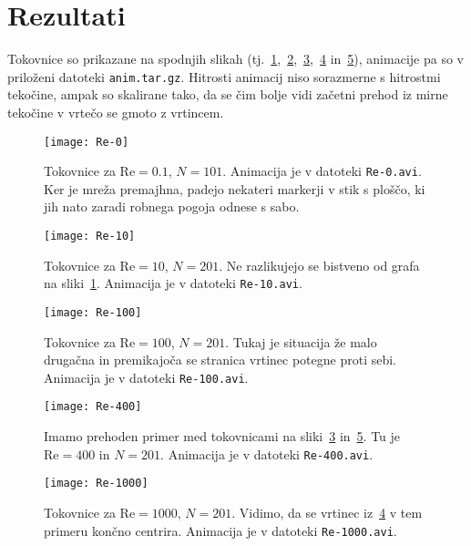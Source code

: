 \documentclass[a4 paper, 12pt]{article}
\renewcommand{\Re}{
    \ensuremath{\mathrm{Re}}
}
\begin{document}
\section{Rezultati}

Tokovnice so prikazane na spodnjih slikah (tj.~\ref{gr1},~\ref{gr1a},~\ref{gr2},~\ref{gr-prehod} in~\ref{gr3}),
animacije pa so v prilo\v zeni datoteki {\tt anim.tar.gz}. Hitrosti animacij niso sorazmerne s hitrostmi teko\v cine,
ampak so skalirane tako, da se \v cim bolje vidi za\v cetni prehod iz mirne teko\v cine v vrte\v co se gmoto z
vrtincem.

\begin{figure}[H]\centering
    \texttt{[image: Re-0]}
    \caption{Tokovnice za $\Re = 0.1$, $N = 101$. Animacija je v datoteki {\tt Re-0.avi}. Ker je mre\v za premajhna,
    padejo nekateri markerji v stik s plo\v s\v co, ki jih nato zaradi robnega pogoja odnese s sabo.}
    \label{gr1}
\end{figure}

\begin{figure}[H]\centering
    \texttt{[image: Re-10]}
    \caption{Tokovnice za $\Re = 10$, $N = 201$. Ne razlikujejo se bistveno od
    grafa na sliki~\ref{gr1}. Animacija je v datoteki {\tt Re-10.avi}.}
    \label{gr1a}
\end{figure}

\begin{figure}[H]\centering
    \texttt{[image: Re-100]}
    \caption{Tokovnice za $\Re = 100$, $N = 201$. Tukaj je situacija \v ze malo druga\v cna
    in premikajo\v ca se stranica vrtinec potegne proti sebi. Animacija je v datoteki
    {\tt Re-100.avi}.}
    \label{gr2}
\end{figure}

\begin{figure}[H]\centering
    \texttt{[image: Re-400]}
    \caption{Imamo prehoden primer med tokovnicami na sliki~\ref{gr2} in~\ref{gr3}. Tu je
    $\Re = 400$ in $N = 201$. Animacija je v datoteki {\tt Re-400.avi}.}
    \label{gr-prehod}
\end{figure}

\begin{figure}[H]\centering
    \texttt{[image: Re-1000]}
    \caption{Tokovnice za $\Re = 1000$, $N = 201$. Vidimo, da se vrtinec iz~\ref{gr-prehod} v tem
    primeru kon\v cno centrira. Animacija je v datoteki {\tt Re-1000.avi}.}
    \label{gr3}
\end{figure}
\end{document}
